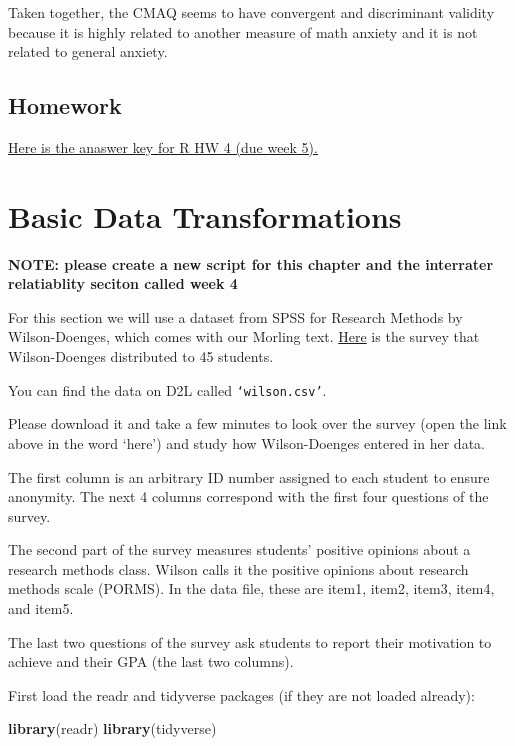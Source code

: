 \documentclass[
]{book}
\newenvironment{Shaded}{\begin{snugshade}}{\end{snugshade}}
\newcommand{\KeywordTok}[1]{\textcolor[rgb]{0.13,0.29,0.53}{\textbf{#1}}}
\newcommand{\NormalTok}[1]{#1}
\begin{document}
Taken together, the CMAQ seems to have convergent and discriminant validity because it is highly related to another measure of math anxiety and it is not related to general anxiety.

\hypertarget{homework}{%
\section{Homework}\label{homework}}

\href{./measurementhw.R}{Here is the anaswer key for R HW 4 (due week 5).}

\hypertarget{basic-data-transformations}{%
\chapter{Basic Data Transformations}\label{basic-data-transformations}}

\textbf{NOTE: please create a new script for this chapter and the interrater relatiablity seciton called week 4}

For this section we will use a dataset from SPSS for Research Methods by Wilson-Doenges, which comes with our Morling text. \href{https://docs.google.com/document/d/1V1vHljcqtVYXE-2iHcdcR0FNzjdCmJXc6Je5TuWMPuk/edit?usp=sharing}{Here} is the survey that Wilson-Doenges distributed to 45 students.

You can find the data on D2L called \texttt{‘wilson.csv’}.

Please download it and take a few minutes to look over the survey (open the link above in the word `here') and study how Wilson-Doenges entered in her data.

The first column is an arbitrary ID number assigned to each student to ensure anonymity. The next 4 columns correspond with the first four questions of the survey.

The second part of the survey measures students' positive opinions about a research methods class. Wilson calls it the positive opinions about research methods scale (PORMS). In the data file, these are item1, item2, item3, item4, and item5.

The last two questions of the survey ask students to report their motivation to achieve and their GPA (the last two columns).

First load the readr and tidyverse packages (if they are not loaded already):

\begin{Shaded}
\begin{Highlighting}[]
\KeywordTok{library}\NormalTok{(readr)}
\KeywordTok{library}\NormalTok{(tidyverse)}
\end{Highlighting}
\end{Shaded}
\end{document}
